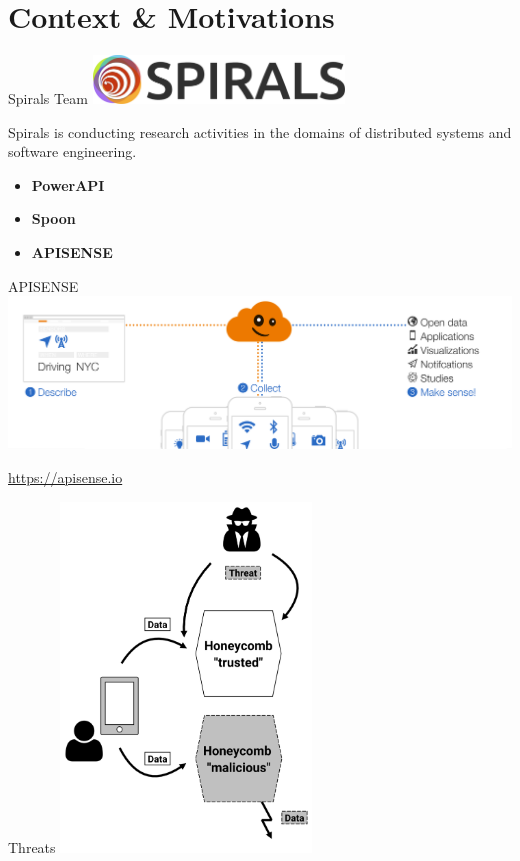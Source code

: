 \section{Context \& Motivations}

\def\UrlFont{\bfseries}

\begin{frame}{Spirals Team}
    \center
    \includegraphics[width=0.5\textwidth]{figures/spirals}
    \vspace{7mm}

    \large{Spirals is conducting research activities in the domains of distributed systems and software engineering.}
    \vspace{7mm}
    \begin{itemize}
        \centering
	    \item[] \textbf{PowerAPI}
        \item[] \textbf{Spoon}
        \item[] \textbf{APISENSE}
    \end{itemize}
\end{frame}

\begin{frame}{APISENSE}
    \includegraphics[width=\textwidth]{figures/apisense}
    \center
    \vspace{7mm}
    
    \url{https://apisense.io}
\end{frame}

\begin{frame}{Threats}
    \center
    \includegraphics[width=0.5\textwidth]{figures/threat}
\end{frame}


